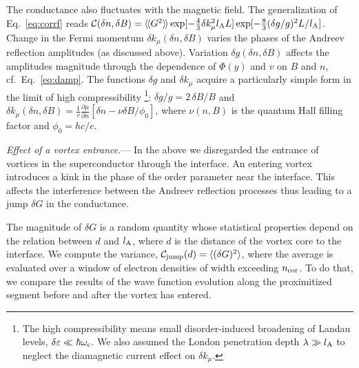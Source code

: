 \documentclass[reprint,
superscriptaddress,
amsmath,
amssymb,
aps,
prl,
floatfix,
english
]{revtex4-2}
\newcommand{\lprox}{L}
\newcommand{\lA}{l_{\rm A}}
\newcommand{\dv}{d}
\newcommand{\Cjump}{{\cal C}_{\rm jump}}
\newcommand{\rngl}{\rangle\hspace{-0.05cm}\rangle}
\newcommand{\lngl}{\langle\hspace{-0.05cm}\langle}
\begin{document}
The conductance also fluctuates with the magnetic field. 
The generalization of Eq.~\eqref{eq:corrf} reads ${\cal C}(\delta n, \delta B) = \lngl G^2 \rngl \exp[-\frac{4}{3} \delta k_{\mu}^2 \lA \lprox] \exp[- \frac{8}{3} (\delta g / g)^2 \lprox / \lA ]$.
Change in the Fermi momentum $\delta k_\mu (\delta n, \delta B)$ varies the phases of the Andreev reflection amplitudes (as discussed above). Variation $\delta g (\delta n, \delta B)$
affects the amplitudes magnitude through the dependence of $\Phi(y)$ and $v$ on $B$ and $n$, cf.~Eq.~\eqref{eq:damp}. The functions $\delta g$ and $\delta k_\mu$ acquire a particularly simple form in the limit of high compressibility \footnote{The high compressibility means 
small disorder-induced broadening of Landau levels, $\delta \varepsilon \ll \hbar \omega_{\rm c}$. 
We also assumed the London penetration depth $\lambda \gg \lA$ to neglect the diamagnetic current effect on $\delta k_\mu$.}:
$\delta g / g = 2\, \delta B / B$ and $\delta k_\mu (\delta n, \delta B) = \frac{1}{v}\frac{\partial \mu}{\partial n} [\delta n - \nu \delta B / \phi_0]$, where $\nu(n, B)$ is the quantum Hall filling factor and $\phi_0 = h c / e$.

\textit{Effect of a vortex entrance.}---
In the above we disregarded the entrance of vortices in the superconductor through the interface.
An entering vortex introduces a kink in the phase of the order parameter near the interface. This affects the interference between the Andreev reflection processes thus leading to a jump $\delta G$ in the conductance.

The magnitude of $\delta G$ is a random quantity whose statistical properties depend on the relation between $\dv$ and $\lA$, where $d$ is the distance of the vortex core to the interface. We compute the variance, $\Cjump(d) = \langle (\delta G)^2 \rangle$,
where the average is evaluated over a window of electron densities of width exceeding $n_{\rm cor}$. To do that, we compare the results of the wave function evolution along the proximitized segment before and after the vortex has entered. 
\end{document}
